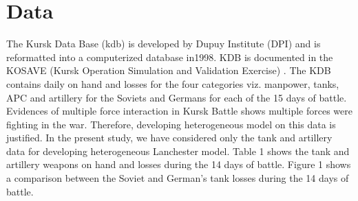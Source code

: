 \documentclass[]{article}
\begin{document}
\section{Data}
The Kursk Data Base (\acrshort{kdb}) is developed by Dupuy Institute (DPI) and is reformatted into a computerized database in1998. KDB is documented in the KOSAVE (Kursk Operation Simulation and Validation Exercise) \autocite{KOSAVEII:1998}. The KDB contains daily on hand and losses for the four categories viz. manpower, tanks, APC and artillery for the Soviets and Germans for each of the 15 days of battle. Evidences of multiple force interaction in Kursk Battle shows multiple forces were fighting in the war. Therefore, developing heterogeneous model on this data is justified. In the present study, we have considered only the tank and artillery data for developing heterogeneous Lanchester model. Table 1 shows the tank and artillery weapons on hand and losses during the 14 days of battle. Figure 1 shows a comparison between the Soviet and German's tank losses during the 14 days of battle.
\end{document}
